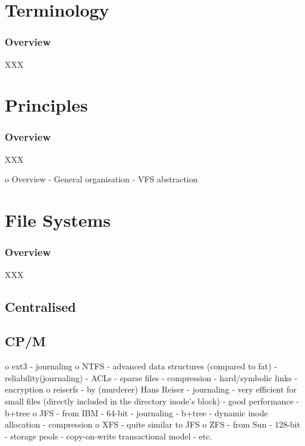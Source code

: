 %
%

\section{Terminology}


\begin{frame}
  \frametitle{Overview}

  XXX
\end{frame}

%
%

\section{Principles}


\begin{frame}
  \frametitle{Overview}

  XXX
\end{frame}

o Overview
  - General organisation
  - VFS abstraction

%
%

\section{File Systems}


\begin{frame}
  \frametitle{Overview}

  XXX
\end{frame}


\subsection{Centralised}

\subsection{CP/M}



 o ext3
  - journaling
 o NTFS
  - advanced data structures (compared to fat)
  - reliability(journaling)
  - ACLs
  - sparse files
  - compression
  - hard/symbolic links
  - encryption
 o reiserfs
  - by (murderer) Hans Reiser
  - journaling
  - very efficient for small files (directly included in the directory inode's block)
  - good performance
  - b+tree
 o JFS
  - from IBM
  - 64-bit
  - journaling
  - b+tree
  - dynamic inode allocation
  - compression
 o XFS
  - quite similar to JFS
 o ZFS
  - from Sun
  - 128-bit
  - storage pools
  - copy-on-write transactional model
  - etc.

